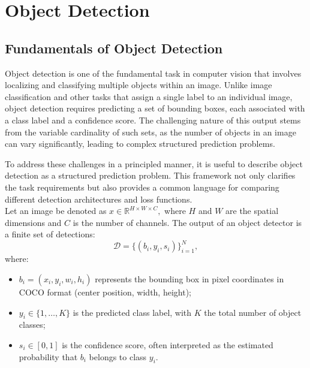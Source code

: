 \chapter{Object Detection}
\label{ch:object-detection}
\section{Fundamentals of Object Detection}

Object detection is one of the fundamental task in computer vision that involves localizing and classifying multiple objects within an image. Unlike image classification and other tasks that assign a single label to an individual image, object detection requires predicting a set of bounding boxes, each associated with a class label and a confidence score. The challenging nature of this output stems from the variable cardinality of such sets, as the number of objects in an image can vary significantly, leading to complex structured prediction problems.

To address these challenges in a principled manner, it is useful to describe object detection as a structured prediction problem. This framework not only clarifies the task requirements but also provides a common language for comparing different detection architectures and loss functions.\\

Let an image be denoted as 
$
x \in \mathbb{R}^{H \times W \times C},
$
where $H$ and $W$ are the spatial dimensions and $C$ is the number of channels.
The output of an object detector is a finite set of detections:
$$
\mathcal{D} = \{ (b_i, y_i, s_i) \}_{i=1}^N,
$$
where:
\begin{itemize}
    \item $b_i = (x_i, y_i, w_i, h_i)$ represents the bounding box in pixel coordinates in COCO format (center position, width, height);
    \item $y_i \in \{1, \dots, K\}$ is the predicted class label, with $K$ the total number of object classes;
    \item $s_i \in [0,1]$ is the confidence score, often interpreted as the estimated probability that $b_i$ belongs to class $y_i$.
\end{itemize}

